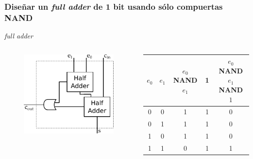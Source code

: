 \documentclass[mathserif,hyperref]{beamer}
\begin{document}
\begin{frame}
\frametitle{\small Diseñar un \textit{full adder} de 1 bit usando sólo
compuertas NAND}
\textit{full adder}
\begin{columns}[T]
  \begin{figure}[htp]
    \includegraphics[scale=0.9]{fulladder.pdf}
  \end{figure}

  \small \begin{center}\begin{tabular}{| c | c || c | c || c |}
    \hline
    $e_0$ & $e_1$ & $e_0$ NAND $e_1$ & 1 &  $e_0$ NAND $e_1$ NAND $1$ \\
    \hline
      0   &   0   &         1        & 1 &               0            \\
      0   &   1   &         1        & 1 &               0            \\
      1   &   0   &         1        & 1 &               0            \\
      1   &   1   &         0        & 1 &               1            \\
    \hline
  \end{tabular}\end{center}
\end{columns}
\end{frame}
\end{document}
